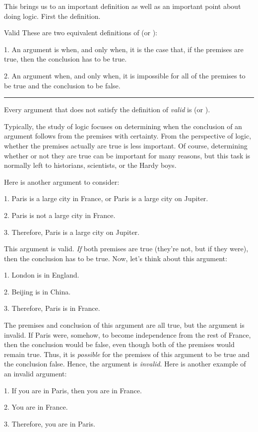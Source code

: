 This brings us to an important definition as well as an important point about doing logic. First the definition. 
\begin{factboxy}{Valid}
These are two equivalent definitions of  (or ):
\begin{ebullet}
\vspace{-2mm}
\item[1.] An argument is  when, and only when, it is the case that, if the premises are true, then the conclusion has to be true.

\item[2.] An argument  when, and only when, it is impossible for all of the premises to be true and the conclusion to be false.
\end{ebullet}

\hrule
\medskip

Every argument that does not satisfy the definition of \textit{valid} is  (or ).
\end{factboxy}
\noindent Typically, the study of logic focuses on determining when the conclusion of an argument follows from the premises with certainty. From the perspective of logic, whether the premises actually are true is less important. Of course, determining whether or not they are true can be important for many reasons, but this task is normally left to historians, scientists, or the Hardy boys.

Here is another argument to consider:
	\begin{earg}
		\item[1.] Paris is a large city in France, or Paris is a large city on Jupiter.
		\item[2.] Paris is not a large city in France.
		\item[3.] Therefore, Paris is a large city on Jupiter.
	\end{earg}
This argument is valid. \emph{If} both premises are true (they're not, but if they were), then the conclusion has to be true. Now, let's think about this argument:
	\begin{earg}
		\item[1.] London is in England.
		\item[2.] Beijing is in China.
		\item[3.] Therefore, Paris is in France.
	\end{earg}
The premises and conclusion of this argument are all true, but the argument is invalid. If Paris were, somehow, to become independence from the rest of France, then the conclusion would be false, even though both of the premises would remain true. Thus, it is \emph{possible} for the premises of this argument to be true and the conclusion false. Hence, the argument is \textit{invalid}. Here is another example of an invalid argument:
	\begin{earg}
		\item[1.] If you are in Paris, then you are in France.
		\item[2.] You are in France.
		\item[3.] Therefore, you are in Paris.
	\end{earg}

